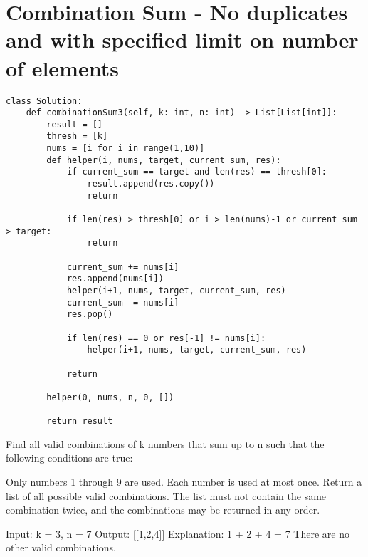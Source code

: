 \documentclass[a4]{article}
\begin{document}
\section{Combination Sum - No duplicates and with specified limit on number of elements}
\begin{lstlisting}
class Solution:
    def combinationSum3(self, k: int, n: int) -> List[List[int]]:
        result = []
        thresh = [k]
        nums = [i for i in range(1,10)]
        def helper(i, nums, target, current_sum, res):
            if current_sum == target and len(res) == thresh[0]:
                result.append(res.copy())
                return
                
            if len(res) > thresh[0] or i > len(nums)-1 or current_sum > target:
                return
            
            current_sum += nums[i]
            res.append(nums[i])
            helper(i+1, nums, target, current_sum, res)
            current_sum -= nums[i]
            res.pop()
            
            if len(res) == 0 or res[-1] != nums[i]:
                helper(i+1, nums, target, current_sum, res)
            
            return
        
        helper(0, nums, n, 0, [])
        
        return result
\end{lstlisting}

Find all valid combinations of k numbers that sum up to n such that the following conditions are true:

Only numbers 1 through 9 are used.
Each number is used at most once.
Return a list of all possible valid combinations. The list must not contain the same combination twice, and the combinations may be returned in any order.

Input: k = 3, n = 7
Output: [[1,2,4]]
Explanation:
1 + 2 + 4 = 7
There are no other valid combinations.

\newpage
\end{document}
